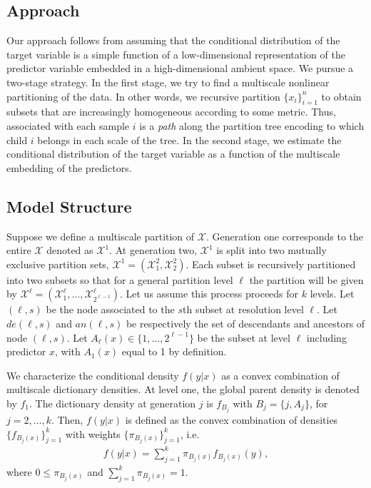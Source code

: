 \documentclass{article}
\newcommand{\jovo}[1]{{\color{magenta}{\it JoVo says: #1}}}
\begin{document}
\subsection{Approach}


Our approach follows from assuming that the conditional distribution of the target variable is a simple function of a low-dimensional representation of the predictor variable embedded in a high-dimensional ambient space.  We pursue a two-stage strategy.  In the first stage, we try to find a multiscale nonlinear partitioning of the data.  In other words, we recursive partition $\{x_i\}_{i=1}^n$ to obtain subsets that are increasingly homogeneous according to some metric.  Thus, associated with each sample $i$ is a \emph{path} along the partition tree encoding to which child $i$ belongs in each scale of the tree.  In the second stage, we estimate the conditional distribution of the target variable as a function of the multiscale embedding of the predictors.


\subsection{ Model Structure} 


Suppose we define a multiscale partition of $\mathcal{X}$.  Generation one corresponds to the entire $\mathcal{X}$ denoted as $\mathcal{X}^1$.  At generation two, $\mathcal{X}^1$ is split into two mutually exclusive partition sets, $\mathcal{X}^1=\left(\mathcal{X}^2_1, \mathcal{X}^2_2\right)$. Each subset is recursively partitioned into two subsets so that for a general partition level $\ell$ the partition will be given by $\mathcal{X}^{\ell}=\left(\mathcal{X}^{\ell}_1, \ldots, \mathcal{X}^{\ell}_{2^{\ell-1}}\right)$.  Let us assume this process proceeds for $k$ levels. Let $(\ell,s)$ be the node associated to the $s$th subset at resolution level $\ell$. Let $de(\ell,s)$ and $an(\ell,s)$ be respectively the set of descendants and ancestors of node $(\ell, s)$. Let $A_{\ell}(x) \in \{1, \ldots, 2^{\ell-1}\}$ be the subset at level $\ell$ including predictor $x$, with $A_1(x)$ equal to 1 by definition. 

We characterize the conditional density $f(y|x)$ as a convex combination of multiscale dictionary densities.  At level one, the global parent density is denoted by $f_1$. The dictionary density at generation $j$ is $f_{B_j}$ with $B_j=\{j,A_j\}$, for $j=2,\ldots, k$. Then, $f(y|x)$ is defined as the convex combination of densities $\{f_{B_j(x)}\}_{j=1}^k$ with weights $\{\pi_{B_j(x)} \}_{j=1}^k$, i.e.
\begin{eqnarray}
f(y|x) = \sum_{j=1}^k \pi_{B_j(x)} f_{B_j(x)}(y),  \label{eq:base}
\end{eqnarray}
where $0 \le \pi_{B_j(x)}$ and $\sum_{j=1}^k \pi_{B_j(x)}=1$. 
\end{document}
